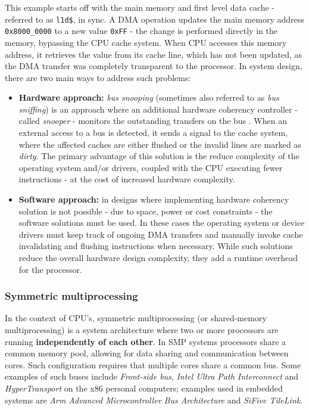 \noindent This example starts off with the main memory and first level data cache - referred to as \texttt{l1d\$}, in sync.
A DMA operation updates the main memory address \texttt{0x8000\_0000} to a new value \texttt{0xFF} - the change is performed directly
in the memory, bypassing the CPU cache system. When CPU accesses this memory address, it retrieves the value from its
cache line, which has not been updated, as the DMA transfer was completely transparent to the processor.
In system design, there are two main ways to address such problems:

\begin{itemize}
	\item \textbf{Hardware approach:} \textit{bus snooping} (sometimes also referred to as \textit{bus sniffing}) is an
		approach where an additional hardware coherency controller - called \textit{snooper} - monitors the outstanding
		transfers on the bus \cite{snoopy}. When an external access to a bus is detected, it sends a signal to the cache system, where the
		affected caches are either flushed or the invalid lines are marked as \textit{dirty}. The primary advantage of this solution is the reduce
		complexity of the operating system and/or drivers, coupled with the CPU executing fewer instructions - at the cost of increased hardware complexity.
	\item \textbf{Software approach:} in designs where implementing hardware coherency solution is not possible - due to space, power or cost constraints -
		the software solutions must be used. In these cases the operating system or device drivers must keep track of ongoing DMA transfers and manually
		invoke cache invalidating and flushing instructions when necessary. While such solutions reduce the overall hardware design complexity, they add a
		runtime overhead for the processor.
\end{itemize}


\subsubsection{Symmetric multiprocessing}

In the context of CPU's, symmetric multiprocessing (or shared-memory multiprocessing) is a system architecture where two or more processors
are running \textbf{independently of each other}. In SMP systems processors share a common memory pool, allowing for data sharing and communication
between cores. Such configuration requires that multiple cores share a common bus. Some examples of such buses include \textit{Front-side bus}, \textit{Intel Ultra Path Interconnect}
and \textit{HyperTransport} on the x86 personal computers; examples used in embedded systems are \textit{Arm Advanced Microcontroller Bus Architecture} and \textit{SiFive TileLink}.

